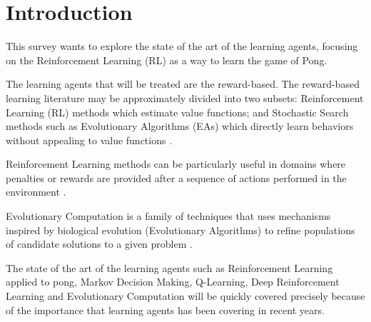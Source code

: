 \section{Introduction}

This survey wants to explore the state of the art of the learning agents, focusing on the Reinforcement Learning (RL) as a way to learn the game of Pong.

The learning agents that will be treated are the reward-based.
The reward-based learning literature may be approximately divided into
two subsets: Reinforcement Learning (RL) methods which estimate value functions; and Stochastic Search methods such as Evolutionary Algorithms (EAs) which directly learn behaviors without appealing to value functions \cite{panait2005cooperative}.

Reinforcement Learning methods can be particularly useful in domains where penalties or rewards are provided after a sequence of actions performed in the environment \cite{panait2005cooperative}.

Evolutionary Computation is a family of techniques that uses mechanisms inspired by biological evolution (Evolutionary Algorithms) to refine populations of candidate solutions to a given problem \cite{vikhar2016evolutionary}.

The state of the art of the learning agents such as Reinforcement Learning applied to pong, Markov Decision Making, Q-Learning, Deep Reinforcement Learning and Evolutionary Computation will be quickly covered precisely because of the importance that learning agents has been covering in recent years.